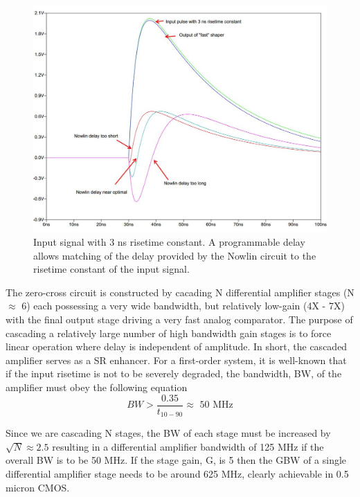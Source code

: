 \documentclass[12pt, onecolumn]{IEEEtran}
\begin{document}
\begin{figure}[htbp!]
	\centering
 	\includegraphics[scale=0.6,keepaspectratio=true]{./images/nowlin_fast.jpg}
 	\caption{Input signal with 3 ns risetime constant. A programmable delay allows matching of the delay provided by the Nowlin circuit to the risetime constant of the input signal.}
 	\label{TypicalWaveforms}
\end{figure}

\noindent
\newline
The zero-cross circuit is constructed by cacading N differential amplifier stages (N $\approx$ 6) each possessing a very wide bandwidth, but relatively low-gain (4X - 7X) with the final output stage driving a very fast analog comparator.  The purpose of cascading a relatively large number of high bandwidth gain stages is to force linear operation where delay is independent of amplitude.  In short, the cascaded amplifier serves as a SR enhancer.  For a first-order system, it is well-known that if the input risetime is not to be severely degraded, the bandwidth, BW, of the amplifier must obey the following equation\\

\begin{equation*}
	BW > \frac{0.35}{t_{10-90}} \approx \text{ 50 MHz}
\end{equation*}

\noindent
\newline
Since we are cascading N stages, the BW of each stage must be increased by $\sqrt{N} \approx 2.5$ resulting in a differential amplifier bandwidth of 125 MHz if the overall BW is to be 50 MHz.  If the stage gain, G, is 5 then the GBW of a single differential amplifier stage needs to be around 625 MHz, clearly achievable in 0.5 micron CMOS.
\end{document}
